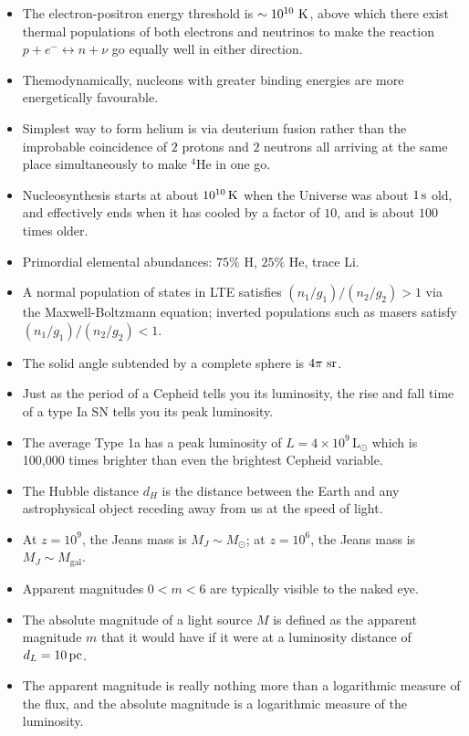 \documentclass[a4paper,10pt]{article}
\begin{document}
\begin{itemize}
    \item The electron-positron energy threshold is $\sim10^{10}~{\rm K}$, above which there exist thermal populations of both electrons and neutrinos to make the reaction $p+e^-\leftrightarrow n+\nu$ go equally well in either direction.
    \item Themodynamically, nucleons with greater binding energies are more energetically favourable.
    \item Simplest way to form helium is via deuterium fusion rather than the improbable coincidence of $2$ protons and $2$ neutrons all arriving at the same place simultaneously to make $^4$He in one go.
    \item Nucleosynthesis starts at about $10^{10}\,{\rm K}$ when the Universe was about $1\,{\rm s}$ old, and effectively ends when it has cooled by a factor of $10$, and is about $100$ times older.
    \item Primordial elemental abundances: $75\%$ H, $25\%$ He, trace Li.
    \item A normal population of states in LTE satisfies $(n_1/g_1)/(n_2/g_2)>1$ via the Maxwell-Boltzmann equation; inverted populations such as masers satisfy $(n_1/g_1)/(n_2/g_2)<1$.
    \item The solid angle subtended by a complete sphere is $4\pi~{\rm sr}$.
    \item Just as the period of a Cepheid tells you its luminosity, the rise and fall time of a type Ia SN tells you its peak luminosity.
    \item The average Type 1a has a peak luminosity of $L=4\times10^9\,\mathrm{L}_\odot$ which is 100,000 times brighter than even the brightest Cepheid variable.
    \item The Hubble distance $d_H$ is the distance between the Earth and any astrophysical object receding away from us at the speed of light.
    \item At $z=10^9$, the Jeans mass is $M_J\sim M_\odot$; at $z=10^6$, the Jeans mass is $M_J\sim M_\mathrm{gal}$.
    \item Apparent magnitudes $0<m<6$ are typically visible to the naked eye.
    \item The absolute magnitude of a light source $M$ is defined as the apparent magnitude $m$ that it would have if it were at a luminosity distance of $d_L = 10\,{\rm pc}$.
    \item The apparent magnitude is really nothing more than a logarithmic measure of the flux, and the absolute magnitude is a logarithmic measure of the luminosity.

\end{itemize}
\end{document}
